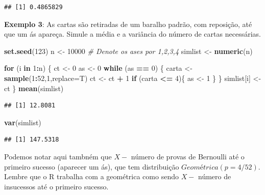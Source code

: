 \documentclass[
]{book}
\newenvironment{Shaded}{\begin{snugshade}}{\end{snugshade}}
\newcommand{\AttributeTok}[1]{\textcolor[rgb]{0.13,0.29,0.53}{#1}}
\newcommand{\CommentTok}[1]{\textcolor[rgb]{0.56,0.35,0.01}{\textit{#1}}}
\newcommand{\ControlFlowTok}[1]{\textcolor[rgb]{0.13,0.29,0.53}{\textbf{#1}}}
\newcommand{\DecValTok}[1]{\textcolor[rgb]{0.00,0.00,0.81}{#1}}
\newcommand{\FunctionTok}[1]{\textcolor[rgb]{0.13,0.29,0.53}{\textbf{#1}}}
\newcommand{\NormalTok}[1]{#1}
\newcommand{\OtherTok}[1]{\textcolor[rgb]{0.56,0.35,0.01}{#1}}
\newcommand{\SpecialCharTok}[1]{\textcolor[rgb]{0.81,0.36,0.00}{\textbf{#1}}}
\begin{document}
\begin{verbatim}
## [1] 0.4865829
\end{verbatim}

\textbf{Exemplo 3}: As cartas são retiradas de um baralho padrão, com
reposição, até que um ás apareça. Simule a média e a variância do número
de cartas necessárias.

\begin{Shaded}
\begin{Highlighting}[]
\FunctionTok{set.seed}\NormalTok{(}\DecValTok{123}\NormalTok{)}
\NormalTok{n }\OtherTok{\textless{}{-}} \DecValTok{10000}
\CommentTok{\# Denote os ases por 1,2,3,4 }
\NormalTok{simlist }\OtherTok{\textless{}{-}} \FunctionTok{numeric}\NormalTok{(n)}

\ControlFlowTok{for}\NormalTok{ (i }\ControlFlowTok{in} \DecValTok{1}\SpecialCharTok{:}\NormalTok{n) \{}
\NormalTok{  ct }\OtherTok{\textless{}{-}} \DecValTok{0}
\NormalTok{  as }\OtherTok{\textless{}{-}} \DecValTok{0}
  \ControlFlowTok{while}\NormalTok{ (as }\SpecialCharTok{==} \DecValTok{0}\NormalTok{) \{}
\NormalTok{    carta }\OtherTok{\textless{}{-}} \FunctionTok{sample}\NormalTok{(}\DecValTok{1}\SpecialCharTok{:}\DecValTok{52}\NormalTok{,}\DecValTok{1}\NormalTok{,}\AttributeTok{replace=}\NormalTok{T)}
\NormalTok{    ct }\OtherTok{\textless{}{-}}\NormalTok{ ct }\SpecialCharTok{+} \DecValTok{1}
    \ControlFlowTok{if}\NormalTok{ (carta }\SpecialCharTok{\textless{}=} \DecValTok{4}\NormalTok{)\{}
\NormalTok{      as }\OtherTok{\textless{}{-}} \DecValTok{1}
\NormalTok{    \}}
\NormalTok{  \}}
\NormalTok{  simlist[i] }\OtherTok{\textless{}{-}}\NormalTok{ ct}
\NormalTok{\}}
\FunctionTok{mean}\NormalTok{(simlist)}
\end{Highlighting}
\end{Shaded}

\begin{verbatim}
## [1] 12.8081
\end{verbatim}

\begin{Shaded}
\begin{Highlighting}[]
\FunctionTok{var}\NormalTok{(simlist)}
\end{Highlighting}
\end{Shaded}

\begin{verbatim}
## [1] 147.5318
\end{verbatim}

Podemos notar aqui tambném que \(X-\) número de provas de Bernoulli até o
primeiro sucesso (aparecer um ás), que tem distribuição
\(Geométrica(p=4/52)\). Lembre que o R trabalha com a geométrica como
sendo \(X-\) número de insucessos até o primeiro sucesso.
\end{document}
